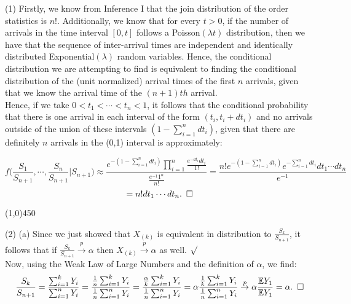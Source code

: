 \documentclass[12pt]{article}
\begin{document}

\def\ci{\perp\!\!\!\perp}
\def\ex{\mathbb{E}}
\def\prob{\mathbb{P}}
\def\ind{\mathbb{I}}
\def\grad{\triangledown}
\def\bigo{\mathcal{O}}

\noindent 
(1) Firstly, we know from Inference I that the join distribution of the order statistics is $n!$. Additionally, we know that for every $t>0$, if the number of arrivals in the time interval $[0,t]$ follows a Poisson$(\lambda t)$ distribution, then we have that the sequence of inter-arrival times are independent and identically distributed Exponential$(\lambda)$ random variables. Hence, the conditional distribution we are attempting to find is equivalent to finding the conditional distribution of the (unit normalized) arrival times of the first $n$ arrivals, given that we know the arrival time of the $(n+1)th$ arrival.\\

\noindent
Hence, if we take $0 < t_1 < \cdots < t_n < 1$, it follows that the conditional probability that there is one arrival in each interval of the form $(t_i,t_i+dt_i)$ and no arrivals outside of the union of these intervals $(1-\sum_{i=1}^n dt_i)$, given that there are definitely $n$ arrivals in the (0,1) interval is approximately:

$$f \biggl(\frac{S_1}{S_{n+1}},\cdots,\frac{S_n}{S_{n+1}} \biggr| S_{n+1} \biggr) 
\approx \frac{e^{-(1-\sum_{i=1}^n dt_i)} \prod_{i=1}^n \frac{e^{-dt_i} dt_i}{1!}} {\frac{e^{-1}1^n}{n!}} 
= \frac{n! e^{-(1-\sum_{i=1}^n dt_i)}e^{-\sum_{i=1}^n dt_i} dt_1\cdots dt_n}{e^{-1}}$$
$$= n! dt_1\cdots dt_n. 
\hspace{5 pt} \square$$ 

\begin{center}
\line(1,0){450}
\end{center}

\noindent
(2) (a) Since we just showed that $X_{(k)}$ is equivalent in distribution to $\frac{S_k}{S_{n+1}}$, it follows that if $\frac{S_k}{S_{n+1}} \overset{p}\to \alpha$ then $X_{(k)}\overset{p}\to \alpha$ as well. $\surd$\\

\noindent
Now, using the Weak Law of Large Numbers and the definition of $\alpha$, we find:
$$\frac{S_k}{S_{n+1}} 
= \frac{\sum_{i=1}^k Y_i}{\sum_{i=1}^n Y_i}
= \frac{\frac{1}{n}\sum_{i=1}^k Y_i}{\frac{1}{n}\sum_{i=1}^n Y_i}
= \frac{\frac{\alpha}{k}\sum_{i=1}^k Y_i}{\frac{1}{n}\sum_{i=1}^n Y_i}
= \alpha \frac{\frac{1}{k}\sum_{i=1}^k Y_i}{\frac{1}{n}\sum_{i=1}^n Y_i}
\overset{p}\to \alpha \frac{\ex Y_1}{\ex Y_1}
= \alpha. 
\hspace{5 pt} \square$$
\end{document}
